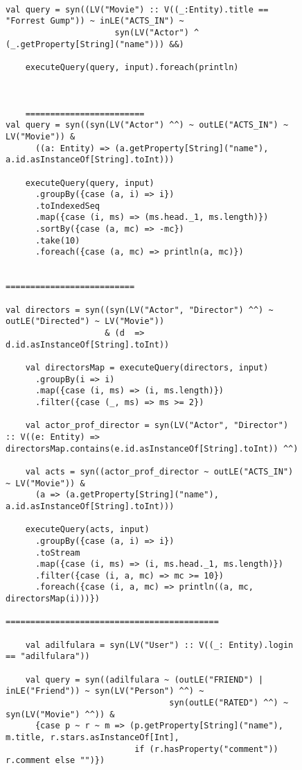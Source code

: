 \begin{figure}[h]
\begin{lstlisting}

val query = syn((LV("Movie") :: V((_:Entity).title == "Forrest Gump")) ~ inLE("ACTS_IN") ~
                      syn(LV("Actor") ^ (_.getProperty[String]("name"))) &&)

    executeQuery(query, input).foreach(println)



    ========================
val query = syn((syn(LV("Actor") ^^) ~ outLE("ACTS_IN") ~ LV("Movie")) &
      ((a: Entity) => (a.getProperty[String]("name"), a.id.asInstanceOf[String].toInt)))

    executeQuery(query, input)
      .groupBy({case (a, i) => i})
      .toIndexedSeq
      .map({case (i, ms) => (ms.head._1, ms.length)})
      .sortBy({case (a, mc) => -mc})
      .take(10)
      .foreach({case (a, mc) => println(a, mc)})


==========================

val directors = syn((syn(LV("Actor", "Director") ^^) ~ outLE("Directed") ~ LV("Movie"))
                    & (d  => d.id.asInstanceOf[String].toInt))

    val directorsMap = executeQuery(directors, input)
      .groupBy(i => i)
      .map({case (i, ms) => (i, ms.length)})
      .filter({case (_, ms) => ms >= 2})

    val actor_prof_director = syn(LV("Actor", "Director") :: V((e: Entity) => directorsMap.contains(e.id.asInstanceOf[String].toInt)) ^^)

    val acts = syn((actor_prof_director ~ outLE("ACTS_IN") ~ LV("Movie")) &
      (a => (a.getProperty[String]("name"), a.id.asInstanceOf[String].toInt)))

    executeQuery(acts, input)
      .groupBy({case (a, i) => i})
      .toStream
      .map({case (i, ms) => (i, ms.head._1, ms.length)})
      .filter({case (i, a, mc) => mc >= 10})
      .foreach({case (i, a, mc) => println((a, mc, directorsMap(i)))})

===========================================

    val adilfulara = syn(LV("User") :: V((_: Entity).login == "adilfulara"))

    val query = syn((adilfulara ~ (outLE("FRIEND") | inLE("Friend")) ~ syn(LV("Person") ^^) ~
                                 syn(outLE("RATED") ^^) ~ syn(LV("Movie") ^^)) &
      {case p ~ r ~ m => (p.getProperty[String]("name"), m.title, r.stars.asInstanceOf[Int],
                          if (r.hasProperty("comment")) r.comment else "")})


\end{lstlisting}
\end{figure}
